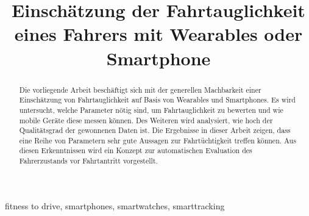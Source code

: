 \documentclass[conference]{IEEEtran}
\begin{document}
\title{Einschätzung der Fahrtauglichkeit eines Fahrers mit Wearables oder Smartphone}

\author{
}

\maketitle

\begin{abstract}
Die vorliegende Arbeit beschäftigt sich mit der generellen Machbarkeit einer Einschätzung von Fahrtauglichkeit auf Basis von Wearables und Smartphones. Es wird untersucht, welche Parameter nötig sind, um Fahrtauglichkeit zu bewerten und wie mobile Geräte diese messen können. Des Weiteren wird analysiert, wie hoch der Qualitätsgrad der gewonnenen Daten ist. Die Ergebnisse in dieser Arbeit zeigen, dass eine Reihe von Parametern sehr gute Aussagen zur Fahrtüchtigkeit treffen können. Aus diesen Erkenntnissen wird ein Konzept zur automatischen Evaluation des Fahrerzustands vor Fahrtantritt vorgestellt.
\end{abstract}

\begin{IEEEkeywords}
fitness to drive, smartphones, smartwatches, smarttracking
\end{IEEEkeywords}








\end{document}
